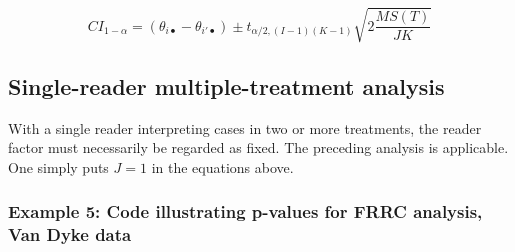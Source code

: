 \documentclass[
]{book}
\begin{document}
\begin{equation}
CI_{1-\alpha}=\left ( \theta_{i \bullet} - \theta_{i' \bullet} \right ) \pm t_{\alpha/2,(I-1)(K-1)}\sqrt{2\frac{MS(T)}{JK}}
\label{eq:confIntervalFRRC}
\end{equation}

\hypertarget{single-reader-multiple-treatment-analysis}{%
\subsection{Single-reader multiple-treatment analysis}\label{single-reader-multiple-treatment-analysis}}

With a single reader interpreting cases in two or more treatments, the reader factor must necessarily be regarded as fixed. The preceding analysis is applicable. One simply puts \(J = 1\) in the equations above.

\hypertarget{example-5-code-illustrating-p-values-for-frrc-analysis-van-dyke-data}{%
\subsubsection{Example 5: Code illustrating p-values for FRRC analysis, Van Dyke data}\label{example-5-code-illustrating-p-values-for-frrc-analysis-van-dyke-data}}
\end{document}
